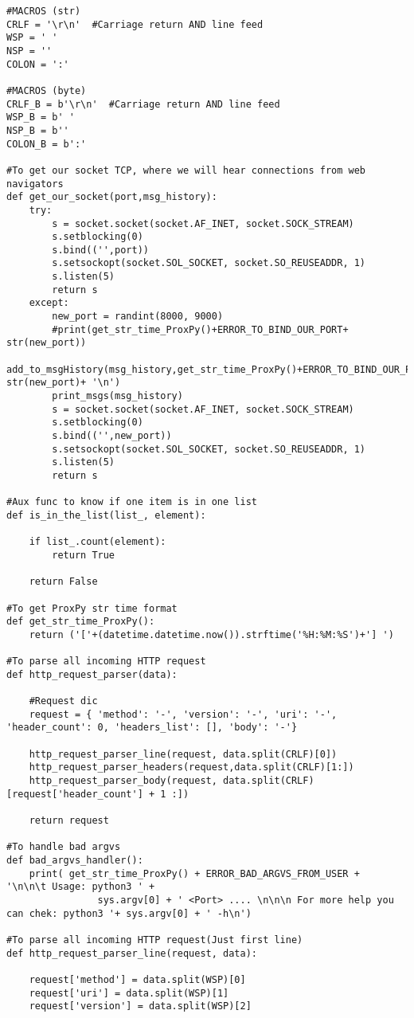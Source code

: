 \begin{verbatim}
#MACROS (str)
CRLF = '\r\n'  #Carriage return AND line feed
WSP = ' '
NSP = ''
COLON = ':'

#MACROS (byte)
CRLF_B = b'\r\n'  #Carriage return AND line feed
WSP_B = b' '
NSP_B = b''
COLON_B = b':'

#To get our socket TCP, where we will hear connections from web navigators
def get_our_socket(port,msg_history):
    try:
        s = socket.socket(socket.AF_INET, socket.SOCK_STREAM)
        s.setblocking(0)
        s.bind(('',port))
        s.setsockopt(socket.SOL_SOCKET, socket.SO_REUSEADDR, 1)
        s.listen(5)
        return s
    except:
        new_port = randint(8000, 9000)
        #print(get_str_time_ProxPy()+ERROR_TO_BIND_OUR_PORT+ str(new_port))
        add_to_msgHistory(msg_history,get_str_time_ProxPy()+ERROR_TO_BIND_OUR_PORT+ str(new_port)+ '\n')
        print_msgs(msg_history)
        s = socket.socket(socket.AF_INET, socket.SOCK_STREAM)
        s.setblocking(0)
        s.bind(('',new_port))
        s.setsockopt(socket.SOL_SOCKET, socket.SO_REUSEADDR, 1)
        s.listen(5)
        return s

#Aux func to know if one item is in one list
def is_in_the_list(list_, element):

    if list_.count(element):
        return True

    return False

#To get ProxPy str time format
def get_str_time_ProxPy():
    return ('['+(datetime.datetime.now()).strftime('%H:%M:%S')+'] ')

#To parse all incoming HTTP request
def http_request_parser(data):

    #Request dic
    request = { 'method': '-', 'version': '-', 'uri': '-', 'header_count': 0, 'headers_list': [], 'body': '-'}
    
    http_request_parser_line(request, data.split(CRLF)[0])
    http_request_parser_headers(request,data.split(CRLF)[1:])
    http_request_parser_body(request, data.split(CRLF)[request['header_count'] + 1 :])

    return request

#To handle bad argvs
def bad_argvs_handler():
    print( get_str_time_ProxPy() + ERROR_BAD_ARGVS_FROM_USER +  '\n\n\t Usage: python3 ' + 
                sys.argv[0] + ' <Port> .... \n\n\n For more help you can chek: python3 '+ sys.argv[0] + ' -h\n')

#To parse all incoming HTTP request(Just first line)
def http_request_parser_line(request, data):

    request['method'] = data.split(WSP)[0]
    request['uri'] = data.split(WSP)[1]
    request['version'] = data.split(WSP)[2]


\end{verbatim}
